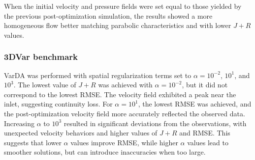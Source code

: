 When the initial velocity and pressure fields were set equal to those yielded by the previous post-optimization simulation, the results showed a more homogeneous flow better matching parabolic characteristics and with lower \(J + R\) values.\\

\subsubsection*{3DVar benchmark}
VarDA was performed with spatial regularization terms set to $\alpha = 10^{-2}$, $10^1$, and $10^3$. The lowest value of $J + R$ was achieved with $\alpha = 10^{-2}$, but it did not correspond to the lowest RMSE. The velocity field exhibited a peak near the inlet, suggesting continuity loss. For $\alpha = 10^1$, the lowest RMSE was achieved, and the post-optimization velocity field more accurately reflected the observed data. Increasing $\alpha$ to $10^3$ resulted in significant deviations from the observations, with unexpected velocity behaviors and higher values of $J + R$ and RMSE. This suggests that lower $\alpha$ values improve RMSE, while higher $\alpha$ values lead to smoother solutions, but can introduce inaccuracies when too large.\\


